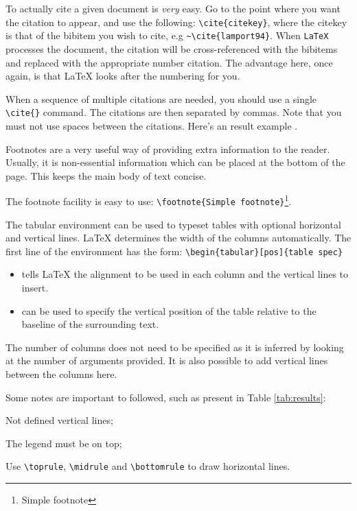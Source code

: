 To actually cite a given document is \textit{very} easy. Go to the point where you want the citation to appear, and use the following: \verb!\cite{citekey}!, where the citekey is that of the bibitem you wish to cite, e.g \verb!~\cite{lamport94}!.  When \texttt{LaTeX} processes the document, the citation will be cross-referenced with the bibitems and replaced with the appropriate number citation. The advantage here, once again, is that LaTeX looks after the numbering for you.

When a sequence of multiple citations are needed, you should use a single \verb!\cite{}! command. The citations are then separated by commas. Note that you must not use spaces between the citations. Here's an result example \cite{strunk,chicago,texbook}.

Footnotes are a very useful way of providing extra information to the reader. Usually, it is non-essential information which can be placed at the bottom of the page. This keeps the main body of text concise.

The footnote facility is easy to use: \verb!\footnote{Simple footnote}!\footnote{Simple footnote}. 

The tabular environment can be used to typeset tables with optional horizontal and vertical lines. LaTeX determines the width of the columns automatically. The first line of the environment has the form: 
\verb!\begin{tabular}[pos]{table spec}!

\begin{itemize}
\item[table spec] tells LaTeX the alignment to be used in each column and the vertical lines to insert.
\item[pos] can be used to specify the vertical position of the table relative to the baseline of the surrounding text. 
\end{itemize}

The number of columns does not need to be specified as it is inferred by looking at the number of arguments provided. It is also possible to add vertical lines between the columns here. 

Some notes are important to followed, such as present in Table \ref{tab:results}: 
\begin{asparaenum}[i)]
	\item Not defined vertical lines;
	\item The legend must be on top;
	\item Use \verb!\toprule!, \verb!\midrule! and \verb!\bottomrule! to draw horizontal lines.
\end{asparaenum}
 
